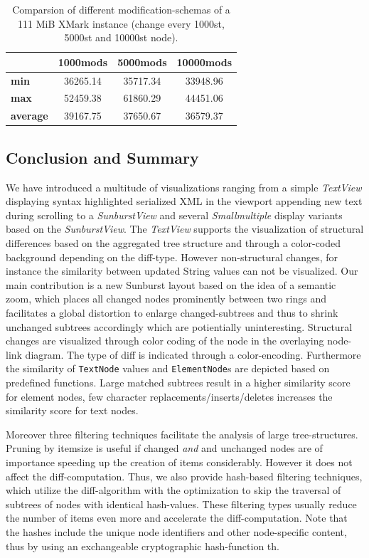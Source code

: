 \begin{table}[tb]
\centering 
\begin{tabular}[r]{|l|c|c|c|} 
\hline
& \textbf{1000mods} & \textbf{5000mods} & \textbf{10000mods}\\
\hline
\hline
\textbf{min} & 36265.14 & 35717.34 & 33948.96\\
\hline
\textbf{max} & 52459.38 & 61860.29 & 44451.06\\
\hline
\textbf{average} & 39167.75 & 37650.67 & 36579.37\\
\hline
\end{tabular}
\label{chap3:comparsion}
\vspace{0.5em} 
\caption{Comparsion of different modification-schemas of a 111 MiB XMark instance (change every 1000st, 5000st and 10000st node).}
\end{table}

\subsection{Conclusion and Summary}
We have introduced a multitude of visualizations ranging from a simple \emph{TextView} displaying syntax highlighted serialized XML in the viewport appending new text during scrolling to a \emph{SunburstView} and several \emph{Smallmultiple} display variants based on the \emph{SunburstView}. The \emph{TextView} supports the visualization of structural differences based on the aggregated tree structure and through a color-coded background depending on the diff-type. However non-structural changes, for instance the similarity between updated String values can not be visualized. Our main contribution is a new Sunburst layout based on the idea of a semantic zoom, which places all changed nodes prominently between two rings and facilitates a global distortion to enlarge changed-subtrees and thus to shrink unchanged subtrees accordingly which are potientially uninteresting. Structural changes are visualized through color coding of the node in the overlaying node-link diagram. The type of diff is indicated through a color-encoding. Furthermore the similarity of \texttt{TextNode} values and \texttt{ElementNode}s are depicted based on predefined functions. Large matched subtrees result in a higher similarity score for element nodes, few character replacements/inserts/deletes increases the similarity score for text nodes.

Moreover three filtering techniques facilitate the analysis of large tree-structures. Pruning by itemsize is useful if changed \emph{and} and unchanged nodes are of importance speeding up the creation of items considerably. However it does not affect the diff-computation. Thus, we also provide hash-based filtering techniques, which utilize the diff-algorithm with the optimization to skip the traversal of subtrees of nodes with identical hash-values. These filtering types usually reduce the number of items even more and accelerate the diff-computation. Note that the hashes include the unique node identifiers and other node-specific content, thus by using an exchangeable cryptographic hash-function th.  

